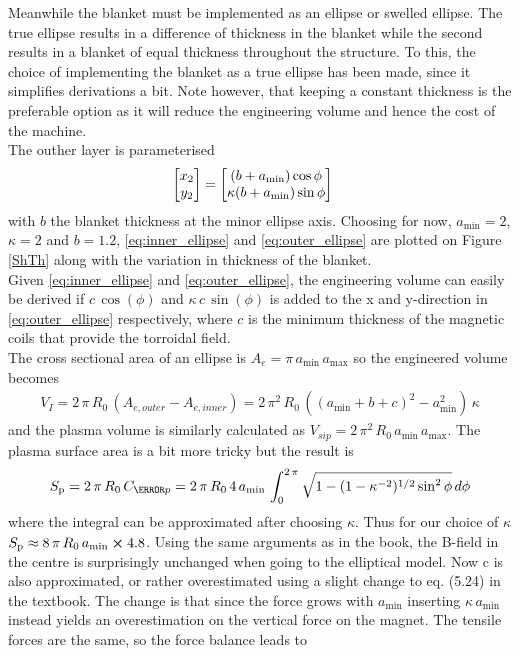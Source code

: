 Meanwhile the blanket must be implemented as an ellipse or swelled ellipse. The true ellipse results in a difference of thickness in the blanket while the second results in a blanket of equal thickness throughout the structure. To this, the choice of implementing the blanket as a true ellipse has been made, since it simplifies derivations a bit. Note however, that keeping a constant thickness is the preferable option as it will reduce the engineering volume and hence the cost of the machine.\\
The outher layer is parameterised 
\begin{align}
	\mqty[x_2 \\y_2] &= \mqty[\pqty{b+a_{\min}}\cos{\phi}\\\kappa \pqty{b+a_{\min}}\sin{\phi}]
	\label{eq:outer_ellipse}
\end{align}
with $b$ the blanket thickness at the minor ellipse axis. Choosing for now, $a_{\min}=2$, $\kappa=2$ and $b=1.2$, \ref{eq:inner_ellipse} and \ref{eq:outer_ellipse} are plotted on Figure \ref{ShTh} along with the variation in thickness of the blanket. \\
Given \ref{eq:inner_ellipse} and \ref{eq:outer_ellipse}, the engineering volume can easily be derived if $c\,\cos(\phi)$ and $\kappa\, c\,\sin(\phi)$ is added to the x and y-direction in \ref{eq:outer_ellipse} respectively, where $c$ is the minimum thickness of the magnetic coils that provide the torroidal field. \\
The cross sectional area of an ellipse is $A_{\si{e}}=\pi\, a_{\min}\, a_{\max}$ so the engineered volume becomes
\begin{align}
	V_{\si{I}}=2\,\pi\, R_{0}\,(A_{\si{e,outer}}-A_{\si{e,inner}})=2\,\pi^{2}\, R_{0}\,\left(\left(a_{\min}+b+c\right)^{2}-a_{\min}^{2}\right)\,\kappa
	\label{eq:engineered_volume}
\end{align}
and the plasma volume is similarly calculated as $V_{si{p}}=2\,\pi^2\, R_{0}\, a_{\min}\, a_{\max}$. The plasma surface area is a bit more tricky but the result is
\begin{align}
	S_{\si{p}}=2\,\pi\, R_{0}\, C_{\s{p}}=2\,\pi\, R_{0}\, 4\, a_{\min}\,\int_{0}^{2\,\pi}\sqrt{1-(1-\kappa^{-2})^{1/2}\sin^{2}{\phi}} \, d\si{\phi}
\end{align}
where the integral can be approximated after choosing $\kappa$. Thus for our choice of $\kappa$ $S_{\si{p}}\approx 8\,\pi\, R_{0}\,a_{\min}\cross 4.8$. Using the same arguments as in the book, the B-field in the centre is surprisingly unchanged when going to the elliptical model. Now c is also approximated, or rather overestimated using a slight change to eq. (5.24) in the textbook. The change is that since the force grows with $a_{\min}$ inserting $\kappa\, a_{\min}$ instead yields an overestimation on the vertical force on the magnet. The tensile forces are the same, so the force balance leads to
